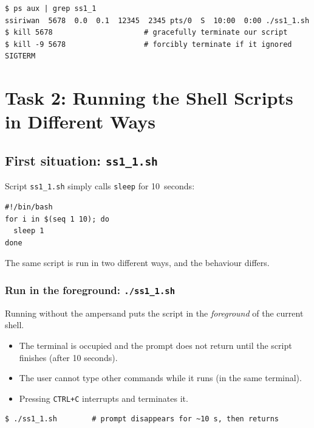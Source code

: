 \documentclass[11pt,a4paper]{article}
\begin{document}
\begin{lstlisting}[style=bashstyle]
$ ps aux | grep ss1_1
ssiriwan  5678  0.0  0.1  12345  2345 pts/0  S  10:00  0:00 ./ss1_1.sh
$ kill 5678                     # gracefully terminate our script
$ kill -9 5678                  # forcibly terminate if it ignored SIGTERM
\end{lstlisting}

\section{Task 2: Running the Shell Scripts in Different Ways}

\subsection{First situation: \texttt{ss1\_1.sh}}

Script \texttt{ss1\_1.sh} simply calls \texttt{sleep} for 10~seconds:

\begin{lstlisting}[style=bashstyle]
#!/bin/bash
for i in $(seq 1 10); do
  sleep 1
done
\end{lstlisting}

The same script is run in two different ways, and the behaviour differs.

\subsubsection*{Run in the foreground: \texttt{./ss1\_1.sh}}
Running without the ampersand puts the script in the \emph{foreground} of the current shell.
\begin{itemize}[leftmargin=2em]
  \item The terminal is occupied and the prompt does not return until the script finishes
        (after 10 seconds).
  \item The user cannot type other commands while it runs (in the same terminal).
  \item Pressing \texttt{CTRL+C} interrupts and terminates it.
\end{itemize}

\begin{lstlisting}[style=bashstyle]
$ ./ss1_1.sh        # prompt disappears for ~10 s, then returns
\end{lstlisting}
\end{document}
